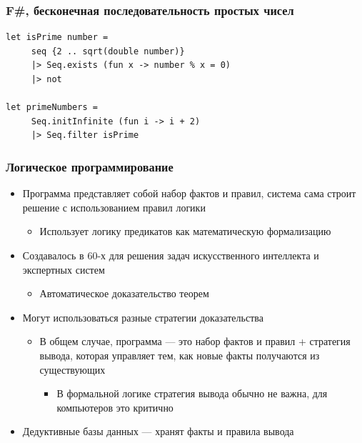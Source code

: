 \documentclass[xetex,mathserif,serif]{beamer}
\begin{document}
	\begin{frame}[fragile]
		\frametitle{F\#, бесконечная последовательность простых чисел}
		\begin{verbatim}
let isPrime number =
     seq {2 .. sqrt(double number)}
     |> Seq.exists (fun x -> number % x = 0) 
     |> not

let primeNumbers =
     Seq.initInfinite (fun i -> i + 2)
     |> Seq.filter isPrime
		\end{verbatim}
	\end{frame}

	\begin{frame}
		\frametitle{Логическое программирование}
		\begin{itemize}
			\item Программа представляет собой набор фактов и правил, система сама строит решение с использованием правил логики
			\begin{itemize}
				\item Использует логику предикатов как математическую формализацию
			\end{itemize}
			\item Создавалось в 60-х для решения задач искусственного интеллекта и экспертных систем
			\begin{itemize}
				\item Автоматическое доказательство теорем
			\end{itemize}
			\item Могут использоваться разные стратегии доказательства
			\begin{itemize}
				\item В общем случае, программа --- это набор фактов и правил + стратегия вывода, которая управляет тем, как новые факты получаются из существующих
				\begin{itemize}
					\item В формальной логике стратегия вывода обычно не важна, для компьютеров это критично
				\end{itemize}
			\end{itemize}
			\item Дедуктивные базы данных --- хранят факты и правила вывода
		\end{itemize}
	\end{frame}
\end{document}
